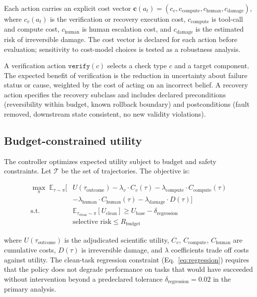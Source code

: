 Each action carries an explicit cost vector $\mathbf{c}(a_t) =
(c_v, c_{\text{compute}}, c_{\text{human}}, c_{\text{damage}})$, where
$c_v(a_t)$ is the verification or recovery execution cost, $c_{\text{compute}}$
is tool-call and compute cost, $c_{\text{human}}$ is human escalation cost,
and $c_{\text{damage}}$ is the estimated risk of irreversible damage.
The cost vector is declared for each action before evaluation; sensitivity
to cost-model choices is tested as a robustness analysis.

A verification action $\texttt{verify}(c)$ selects a check type $c$ and a
target component. The expected benefit of verification is the reduction in
uncertainty about failure status or cause, weighted by the cost of acting
on an incorrect belief. A recovery action specifies the recovery subclass
and includes declared preconditions (reversibility within budget, known
rollback boundary) and postconditions (fault removed, downstream state
consistent, no new validity violations).

\subsection{Budget-constrained utility}

The controller optimizes expected utility subject to budget and safety
constraints. Let $\mathcal{T}$ be the set of trajectories. The objective is:

\begin{align}
    \max_{\pi} \; \mathbb{E}_{\tau \sim \pi}\Big[&
        U(\tau_{\text{outcome}})
        - \lambda_v \cdot C_v(\tau)
        - \lambda_{\text{compute}} \cdot C_{\text{compute}}(\tau) \nonumber\\
        &- \lambda_{\text{human}} \cdot C_{\text{human}}(\tau)
        - \lambda_{\text{damage}} \cdot D(\tau) \Big] \\
    \text{s.t.} \quad & \mathbb{E}_{\tau_{\text{clean}} \sim \pi}[U_{\text{clean}}]
        \geq U_{\text{base}} - \delta_{\text{regression}} \label{eq:regression}\\
    & \text{selective risk} \leq R_{\text{budget}} \nonumber
\end{align}

where $U(\tau_{\text{outcome}})$ is the adjudicated scientific utility,
$C_v$, $C_{\text{compute}}$, $C_{\text{human}}$ are cumulative costs,
$D(\tau)$ is irreversible damage, and $\lambda$ coefficients trade off
costs against utility. The clean-task regression constraint
(Eq.~\ref{eq:regression}) requires that the policy does not degrade
performance on tasks that would have succeeded without intervention beyond
a predeclared tolerance $\delta_{\text{regression}} = 0.02$ in the primary
analysis.

